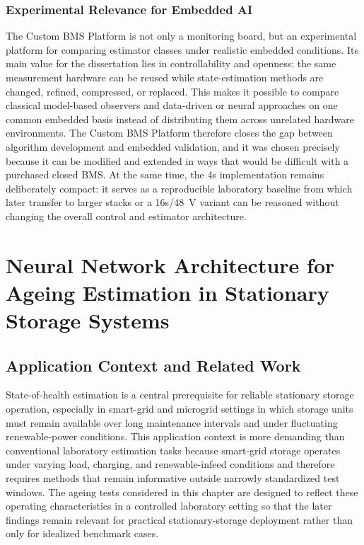 \documentclass[
    a4paper,
    12pt,
    titlepage,
    bibliography=totoc,
    twoside=on,
    parskip=false,
    numbers=noenddot,
    cleardoublepage=empty,
    DIV=12,
    BCOR=12.0mm,
    headheight=36pt,
    headings=openright
]{scrreprt}
\begin{document}
\subsection{Experimental Relevance for Embedded AI}
The Custom BMS Platform is not only a monitoring board, but an experimental platform for comparing estimator classes under realistic embedded conditions. Its main value for the dissertation lies in controllability and openness: the same measurement hardware can be reused while state-estimation methods are changed, refined, compressed, or replaced. This makes it possible to compare classical model-based observers and data-driven or neural approaches on one common embedded basis instead of distributing them across unrelated hardware environments. The Custom BMS Platform therefore closes the gap between algorithm development and embedded validation, and it was chosen precisely because it can be modified and extended in ways that would be difficult with a purchased closed BMS. At the same time, the 4s implementation remains deliberately compact: it serves as a reproducible laboratory baseline from which later transfer to larger stacks or a 16s/\SI{48}{\volt} variant can be reasoned without changing the overall control and estimator architecture.

\chapter{Neural Network Architecture for Ageing Estimation in Stationary Storage Systems}
\section{Application Context and Related Work}
State-of-health estimation is a central prerequisite for reliable stationary storage operation, especially in smart-grid and microgrid settings in which storage units must remain available over long maintenance intervals and under fluctuating renewable-power conditions.\autocite{sahriEnergyManagementSystem2021,solimanSupervisoryEnergyManagement2021} This application context is more demanding than conventional laboratory estimation tasks because smart-grid storage operates under varying load, charging, and renewable-infeed conditions and therefore requires methods that remain informative outside narrowly standardized test windows. The ageing tests considered in this chapter are designed to reflect these operating characteristics in a controlled laboratory setting so that the later findings remain relevant for practical stationary-storage deployment rather than only for idealized benchmark cases.
\end{document}
